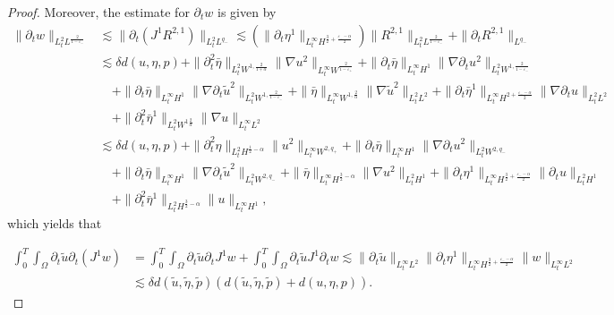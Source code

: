 \documentclass[letterpaper,reqno,10pt,twoside]{amsart}
\theoremstyle{definition}
\theoremstyle{remark}
\def\p{\partial}
\begin{document}
\begin{proof}
			Moreover, the estimate for $\p_{t}w$ is given by
			\[
			\begin{aligned}
				\|\p_{t}w\|_{L_{t}^{2}L^{\frac{2}{1-\varepsilon_{-}}}}&\lesssim \|\p_{t}( J^{1}R^{2,1})\|_{L_{t}^{2}L^{q_{-}}}\lesssim (\|\p_{t}\eta^{1}\|_{L_{t}^{\infty}H^{\frac{3}{2}+\frac{\varepsilon_{-}-\alpha}{2}}})\|R^{2,1}\|_{L_{t}^{2}L^{\frac{2}{1-\varepsilon_{-}}}}+\|\p_{t}R^{2,1}\|_{L^{q_{-}}}\\
				&\lesssim \delta d(u,\eta,p)+\|\p_{t}^{2}\bar{\eta}\|_{L_{t}^{2}W^{1,\frac{2}{1+\alpha}}}\|\nabla u^{2}\|_{L_{t}^{\infty}W^{\frac{2}{1-\varepsilon_{+}}}}+\|\p_{t}\bar{\eta}\|_{L_{t}^{\infty}H^{1}}\|\nabla \p_{t}u^{2}\|_{L_{t}^{2}W^{1,\frac{2}{1-\varepsilon_{-}}}}\\
				&\quad+\|\p_{t}\bar{\eta}\|_{L_{t}^{\infty}H^{1}}\|\nabla \p_{t}\tilde{u}^{2}\|_{L_{t}^{2}W^{1,\frac{2}{1-\varepsilon_{-}}}}+\|\bar{\eta}\|_{L_{t}^{\infty}W^{1,\frac{2}{\alpha}}}\|\nabla \tilde{u}^{2}\|_{L_{t}^{2}L^{2}}+\|\p_{t}\bar{\eta}^{1}\|_{L_{t}^{\infty}H^{2+\frac{\varepsilon_{-}-\alpha}{2}}}\|\nabla \p_{t}u\|_{L_{t}^{2}L^{2}}\\
				&\quad+\|\p_{t}^{2}\bar{\eta}^{1}\|_{L_{t}^{2}W^{1\frac{2}{\alpha}}}\|\nabla u\|_{L_{t}^{\infty}L^{2}}\\
				&\lesssim \delta d(u,\eta,p)+\|\p_{t}^{2}{\eta}\|_{L_{t}^{2}H^{\frac{1}{2}-\alpha}}\| u^{2}\|_{L_{t}^{\infty}W^{2,q_{+}}}+\|\p_{t}\bar{\eta}\|_{L_{t}^{\infty}H^{1}}\|\nabla \p_{t}u^{2}\|_{L_{t}^{2}W^{2,q_{-}}}\\
				&\quad+\|\p_{t}\bar{\eta}\|_{L_{t}^{\infty}H^{1}}\|\nabla \p_{t}\tilde{u}^{2}\|_{L_{t}^{2}W^{2,q_{-}}}+\|\bar{\eta}\|_{L_{t}^{\infty}H^{\frac{3}{2}-\alpha}}\|\nabla {u}^{2}\|_{L_{t}^{2}H^{1}}+\|\p_{t}{\eta}^{1}\|_{L_{t}^{\infty}H^{\frac{3}{2}+\frac{\varepsilon_{-}-\alpha}{2}}}\| \p_{t}u\|_{L_{t}^{2}H^{1}}\\
				&\quad+\|\p_{t}^{2}\bar{\eta}^{1}\|_{L_{t}^{2}H^{\frac{3}{2}-\alpha}}\| u\|_{L_{t}^{\infty}H^{1}},
			\end{aligned}
			\]
			which yields that
			
			\[
			\begin{aligned}
				\int_{0}^{T}\int_{\Omega} \p_{t}\tilde{u}\p_{t}(J^{1}w)&=\int_{0}^{T}\int_{\Omega}\p_{t}\tilde{u}\p_{t}J^{1}w+\int_{0}^{T}\int_{\Omega}\p_{t}\tilde{u} J^{1}\p_{t}w\lesssim\|\p_{t}\tilde{u}\|_{L_{t}^{\infty}L^{2}}\|\p_{t}\eta^{1}\|_{L_{t}^{\infty}H^{\frac{3}{2}+\frac{\varepsilon_{-}-\alpha}{2}}}\|w\|_{L_{t}^{\infty}L^{2}}\\
				&\lesssim \delta d(\tilde{u},\tilde{\eta},\tilde{p})(d(\tilde{u},\tilde{\eta},\tilde{p})+d(u,\eta,p)).
			\end{aligned}
			\]
			

\end{proof}
\end{document}
